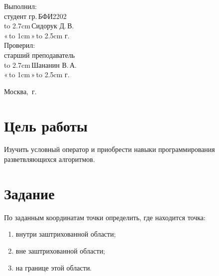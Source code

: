 \documentclass[14pt]{extarticle}
\makeatletter
\newcommand{\hrf}[1]{\hbox to #1{\hrulefill}} %
\newcounter{sectionc} %
\newcommand{\numbersections}{\renewcommand{\Hy@numberline}[1]{##1~}}
\newcommand{\nonumbersections}{\renewcommand{\Hy@numberline}[1]{}}
\let\oldsection\section
\renewcommand{\section}{\numbersections\oldsection}
\let\oldsectionc\sectionc
\renewcommand{\sectionc}{\nonumbersections\oldsectionc}
\renewcommand\tableofcontents{
	\pdfbookmark[sectionc]{\contentsname}{toc} %
	\sectionc*{\contentsname
		\@mkboth{\contentsname}{\contentsname}}
	\@starttoc{toc}
}
\makeatother
\begin{document}
\vfill %

\hfill %
\begin{minipage}{0.45\textwidth} %
	Выполнил:\\[2mm]
	студент гр.\,БФИ2202\\[2mm]
	\hrf{2.7cm}\,Сидорук Д.\,В.\\[2mm]
	«\,\hrf{1cm}\,»\,\hrf{2.5cm}\,\the\year{}\,г.\\[5mm]
	
	Проверил:\\[2mm]
	старший преподаватель\\[2mm]
	\hrf{2.7cm}\,Шананин В.\,А.\\[2mm]
	«\,\hrf{1cm}\,»\,\hrf{2.5cm}\,\the\year{}\,г.
\end{minipage}%

\vfill

\centerline{Москва, \the\year{}\,г.} %
\thispagestyle{empty} %
\newpage %
\tableofcontents %
\newpage %

\section{Цель работы}

Изучить условный оператор и приобрести навыки программирования разветвляющихся алгоритмов.

\section{Задание}

По заданным координатам точки определить, где находится точка:

\begin{enumerate}
    \item внутри заштрихованной области;
    \item вне заштрихованной области;
    \item на границе этой области.
\end{enumerate}
\end{document}
